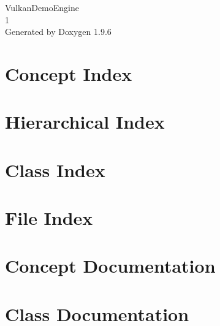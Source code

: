 \documentclass[twoside]{book}
\newcommand{\+}{\discretionary{\mbox{\scriptsize$\hookleftarrow$}}{}{}}
\newcommand{\clearemptydoublepage}{%
    \newpage{\pagestyle{empty}\cleardoublepage}%
  }
\begin{document}
  \raggedbottom
    \hypersetup{pageanchor=false,
                bookmarksnumbered=true,
                pdfencoding=unicode
               }
  \begin{titlepage}
  \vspace*{7cm}
  \begin{center}%
  {\Large Vulkan\+Demo\+Engine}\\
  [1ex]\large 1 \\
  \vspace*{1cm}
  {\large Generated by Doxygen 1.9.6}\\
  \end{center}
  \end{titlepage}
  \clearemptydoublepage
  \tableofcontents
  \clearemptydoublepage
  \hypersetup{pageanchor=true}
\chapter{Concept Index}

\chapter{Hierarchical Index}

\chapter{Class Index}

\chapter{File Index}

\chapter{Concept Documentation}


\chapter{Class Documentation}




























\end{document}

